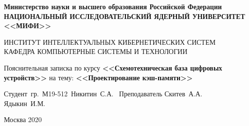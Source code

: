 \documentclass[13pt]{article}
\begin{document}
\begin{titlepage}                                                         
    \newpage                                                                        
    \begin{center}                                                        
    {\bfseries Министерство науки и высшего образования Российской Федерации \\
    НАЦИОНАЛЬНЫЙ ИССЛЕДОВАТЕЛЬСКИЙ ЯДЕРНЫЙ УНИВЕРСИТЕТ <<МИФИ>>}                               
    \vspace{1cm}                                                          
                                                  
    ИНСТИТУТ ИНТЕЛЛЕКТУАЛЬНЫХ КИБЕРНЕТИЧЕСКИХ СИСТЕМ\\
    КАФЕДРА КОМПЬЮТЕРНЫЕ СИСТЕМЫ И ТЕХНОЛОГИИ
    \vspace{6em}                                                          
    \end{center}                                                          
                                                                                        
    \vspace{1.2em}       

                                                                                        
    \begin{center}                                                        
    \Large Пояснительная записка по курсу \linebreak \textbf{<<Схемотехническая база цифровых устройств>>} \linebreak
    на тему: \linebreak
    \textbf{<<Проектирование кэш-памяти>>}
    \end{center}                                                          
    \vspace{20em}                                                                           
    \vbox{%
    \hfill%
    \vbox{%
    \hbox{Студент гр. М19-512 Никитин С.А. \underline{\hspace{3cm}}}
    \hbox{Преподаватель}
    \hbox{Скитев А.А. \underline{\hspace{3cm}}}
    \hbox{Ядыкин И.М.  \underline{\hspace{3cm}}}
    }%
    }                                                          
    \vspace{\fill}                                                    
                                                                                        
    \begin{center}                                                        
    Москва 2020                                                               
    \end{center}                                                          
                                                                                        
    \end{titlepage} 
	\thispagestyle{empty}
	\newpage
	\tableofcontents
	\newpage
\end{document}
